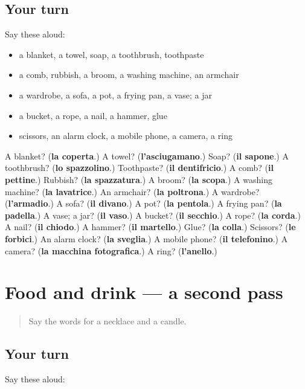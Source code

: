 \subsection*{Your turn}
Say these aloud:

\begin{itemize}
\raggedright
  \item a blanket, a towel, soap, a toothbrush, toothpaste
  \item a comb, rubbish, a broom, a washing machine, an armchair
  \item a wardrobe, a sofa, a pot, a frying pan, a vase; a jar
  \item a bucket, a rope, a nail, a hammer, glue
  \item scissors, an alarm clock, a mobile phone, a camera, a ring
\end{itemize}

\begin{tcolorbox}[breakable,colback=teal!4,colframe=teal!35!black,title={Before you move on}]
A blanket? (\textbf{la coperta}.) A towel? (\textbf{l'asciugamano}.) Soap? (\textbf{il sapone}.) A toothbrush? (\textbf{lo spazzolino}.) Toothpaste? (\textbf{il dentifricio}.) A comb? (\textbf{il pettine}.) Rubbish? (\textbf{la spazzatura}.) A broom? (\textbf{la scopa}.) A washing machine? (\textbf{la lavatrice}.) An armchair? (\textbf{la poltrona}.) A wardrobe? (\textbf{l'armadio}.) A sofa? (\textbf{il divano}.) A pot? (\textbf{la pentola}.) A frying pan? (\textbf{la padella}.) A vase; a jar? (\textbf{il vaso}.) A bucket? (\textbf{il secchio}.) A rope? (\textbf{la corda}.) A nail? (\textbf{il chiodo}.) A hammer? (\textbf{il martello}.) Glue? (\textbf{la colla}.) Scissors? (\textbf{le forbici}.) An alarm clock? (\textbf{la sveglia}.) A mobile phone? (\textbf{il telefonino}.) A camera? (\textbf{la macchina fotografica}.) A ring? (\textbf{l'anello}.)
\end{tcolorbox}
\section[(dialogue)]{Food and drink — a second pass}

\label{lesson:IT-R106-second-pass-food-and-drink}



\begin{quote}
Say the words for a necklace and a candle.
\end{quote}

\subsection*{Your turn}
Say these aloud:

